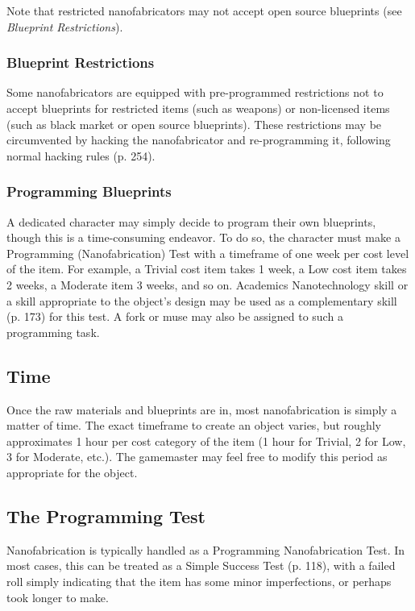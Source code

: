 Note that restricted nanofabricators may not accept open source blueprints (see \textit{Blueprint Restrictions}). 

\subsubsection{Blueprint Restrictions} 

Some nanofabricators are equipped with pre-programmed restrictions not to accept blueprints for restricted items (such as weapons) or non-licensed items (such as black market or open source blueprints). These restrictions may be circumvented by hacking the nanofabricator and re-programming it, following normal hacking rules (p. 254). 

\subsubsection{Programming Blueprints} 

A dedicated character may simply decide to program their own blueprints, though this is a time-consuming endeavor. To do so, the character must make a Programming (Nanofabrication) Test with a timeframe of one week per cost level of the item. For example, a Trivial cost item takes 1 week, a Low cost item takes 2 weeks, a Moderate item 3 weeks, and so on. Academics Nanotechnology skill or a skill appropriate to the object's design may be used as a complementary skill (p. 173) for this test. A fork or muse may also be assigned to such a programming task. 



\subsection{Time} 

Once the raw materials and blueprints are in, most nanofabrication is simply a matter of time. The exact timeframe to create an object varies, but roughly approximates 1 hour per cost category of the item (1 hour for Trivial, 2 for Low, 3 for Moderate, etc.). The gamemaster may feel free to modify this period as appropriate for the object. 

\subsection{The Programming Test} 

Nanofabrication is typically handled as a Programming Nanofabrication Test. In most cases, this can be treated as a Simple Success Test (p. 118), with a failed roll simply indicating that the item has some minor imperfections, or perhaps took longer to make. 

